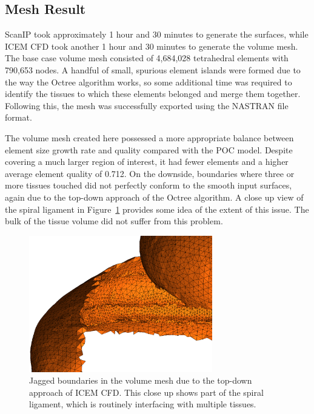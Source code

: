 
\subsection{Mesh Result}

ScanIP took approximately 1 hour and 30 minutes to generate the surfaces, while
ICEM CFD took another 1 hour and 30 minutes to generate the volume mesh. The
base case volume mesh consisted of 4,684,028 tetrahedral elements with 790,653
nodes. A handful of small, spurious element islands were formed due to the way
the Octree algorithm works, so some additional time was required to identify the
tissues to which these elements belonged and merge them together. Following
this, the mesh was successfully exported using the NASTRAN file format.

The volume mesh created here possessed a more appropriate balance between
element size growth rate and quality compared with the POC model. Despite
covering a much larger region of interest, it had fewer elements and a higher
average element quality of 0.712. On the downside, boundaries where three or
more tissues touched did not perfectly conform to the smooth input surfaces,
again due to the top-down approach of the Octree algorithm. A close up view of
the spiral ligament in Figure~\ref{fig:gp_mesh_jaggies} provides some idea of
the extent of this issue. The bulk of the tissue volume did not suffer from this
problem.

\begin{figure}
	\centering
	\includegraphics[width=8cm]{Methodology/gp_mesh_jaggies}
	\caption[Jagged boundaries in the volume mesh]{Jagged boundaries in the volume
	mesh due to the top-down approach of ICEM CFD. This close up shows part of the
	spiral ligament, which is routinely interfacing with multiple tissues.}
	\label{fig:gp_mesh_jaggies}
\end{figure}

